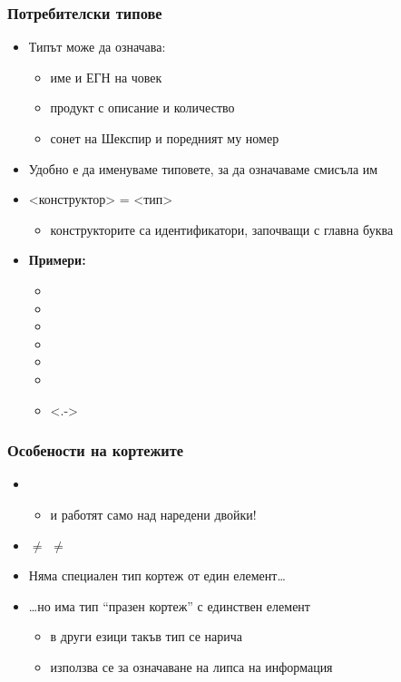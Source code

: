 \documentclass[alsotrans]{beamerswitch}
\begin{document}
\begin{frame}
  \frametitle{Потребителски типове}

  \begin{itemize}[<+->]
  \item Типът  може да означава:
    \begin{itemize}
    \item име и ЕГН на човек
    \item продукт с описание и количество
    \item сонет на Шекспир и поредният му номер
    \end{itemize}
  \item Удобно е да именуваме типовете, за да означаваме смисъла им
  \item {} <конструктор> \tta= <тип>
    \begin{itemize}
    \item конструкторите са идентификатори, започващи с главна буква
    \end{itemize}
  \item \textbf{Примери:}
    \begin{itemize}
    \item {}
    \item {}
    \item {}
    \item {}
    \item {}
    \item {}
    \item<.-> 
    \end{itemize}
  \end{itemize}
\end{frame}

\begin{frame}
  \frametitle{Особености на кортежите}

  \begin{itemize}[<+->]
  \item {}
    \begin{itemize}
    \item {} и  работят само над наредени двойки!
    \end{itemize}
  \item {} $\neq$  $\neq$ 
  \item Няма специален тип кортеж от един елемент\ldots
  \item \ldots но има тип ``празен кортеж'' \lst{()} с единствен елемент \lst{()}
    \begin{itemize}
    \item в други езици такъв тип се нарича 
    \item използва се за означаване на липса на информация
    \end{itemize}
  \end{itemize}
\end{frame}
\end{document}
